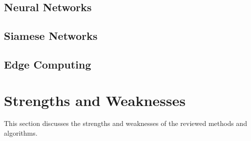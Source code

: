\subsection{Neural Networks}\label{subsec:neural_networks}


\subsection{Siamese Networks}\label{subsec:siamese_networks}


\subsection{Edge Computing}\label{subsec:edge_computing}


\section{Strengths and Weaknesses}\label{sec:strengths_and_weaknesses}
This section discusses the strengths and weaknesses of the reviewed methods and algorithms.

